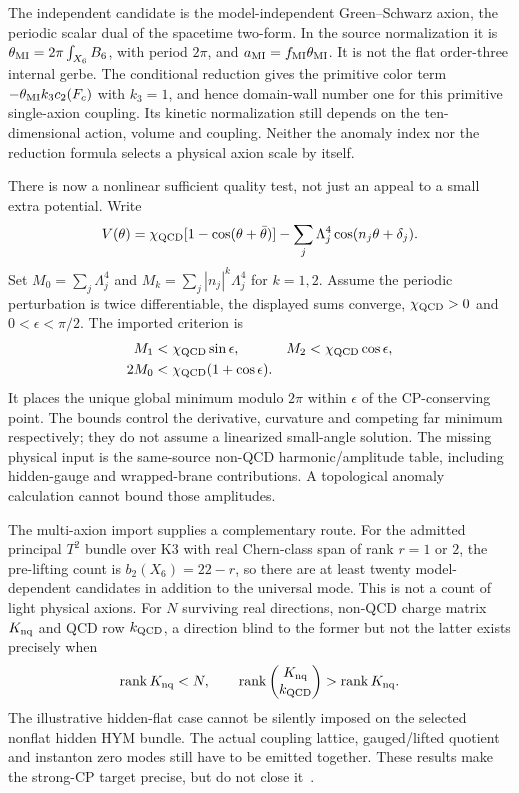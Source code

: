 \documentclass[11pt]{article}
\begin{document}
The independent candidate is the model-independent Green--Schwarz axion, the periodic
scalar dual of the spacetime two-form.  In the source normalization it is
$\theta_{\rm MI}=2\pi\int_{X_6}B_6$, with period $2\pi$, and
$a_{\rm MI}=f_{\rm MI}\theta_{\rm MI}$.  It is not the flat order-three internal gerbe.
The conditional reduction gives the primitive color term
$-\theta_{\rm MI}k_3c_2(F_c)$ with $k_3=1$, and hence domain-wall number one for this
primitive single-axion coupling.  Its kinetic normalization still depends on the
ten-dimensional action, volume and coupling.  Neither the anomaly index nor the reduction
formula selects a physical axion scale by itself.

There is now a nonlinear sufficient quality test, not just an appeal to a small extra
potential.  Write
\begin{equation}
V(\theta)=\chi_{\rm QCD}[1-\cos(\theta+\bar\theta)]
-\sum_j\Lambda_j^4\cos(n_j\theta+\delta_j).
\end{equation}
Set $M_0=\sum_j\Lambda_j^4$ and $M_k=\sum_j|n_j|^k\Lambda_j^4$ for $k=1,2$.
Assume the periodic perturbation is twice differentiable, the displayed sums converge,
$\chi_{\rm QCD}>0$ and $0<\epsilon<\pi/2$.  The imported criterion is
\begin{equation}
\begin{aligned}
M_1&<\chi_{\rm QCD}\sin\epsilon,&
M_2&<\chi_{\rm QCD}\cos\epsilon,\\
2M_0&<\chi_{\rm QCD}(1+\cos\epsilon).
\end{aligned}
\end{equation}
It places the unique global minimum modulo $2\pi$ within $\epsilon$ of the CP-conserving
point.  The bounds control the derivative, curvature and competing far minimum respectively;
they do not assume a linearized small-angle solution.  The missing physical input is the
same-source non-QCD harmonic/amplitude table, including hidden-gauge and wrapped-brane
contributions.  A topological anomaly calculation cannot bound those amplitudes.

The multi-axion import supplies a complementary route.  For the admitted principal
$T^2$ bundle over K3 with real Chern-class span of rank $r=1$ or $2$, the pre-lifting count
is $b_2(X_6)=22-r$, so there are at least twenty model-dependent candidates in addition to
the universal mode.  This is not a count of light physical axions.  For $N$ surviving real
directions, non-QCD charge matrix $K_{\rm nq}$ and QCD row $k_{\rm QCD}$, a direction
blind to the former but not the latter exists precisely when
\begin{equation}
\operatorname{rank}K_{\rm nq}<N,\qquad
\operatorname{rank}\begin{pmatrix}K_{\rm nq}\\ k_{\rm QCD}\end{pmatrix}
>\operatorname{rank}K_{\rm nq}.
\end{equation}
The illustrative hidden-flat case cannot be silently imposed on the selected nonflat
hidden HYM bundle.  The actual coupling lattice, gauged/lifted quotient and instanton
zero modes still have to be emitted together.  These results make the strong-CP target
precise, but do not close it~\cite{SMAxion}.
\end{document}
